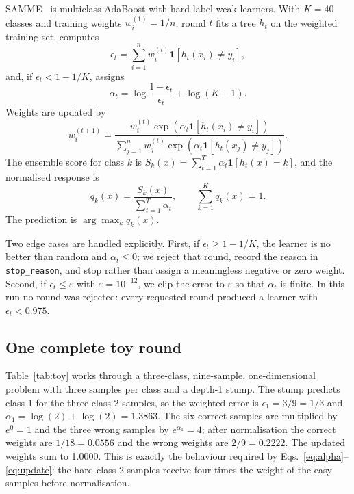 \documentclass[10pt,twocolumn,letterpaper]{article}
\begin{document}
SAMME~\cite{zhu2009,freund1997} is multiclass AdaBoost with hard-label weak
learners.  With $K=40$
classes and training weights $w_i^{(1)}=1/n$, round $t$ fits a tree $h_t$ on the
weighted training set, computes
\begin{equation}
\epsilon_t=\sum_{i=1}^{n} w_i^{(t)}\mathbf{1}[h_t(x_i)\neq y_i],
\end{equation}
and, if $\epsilon_t<1-1/K$, assigns
\begin{equation}
\alpha_t=\log\frac{1-\epsilon_t}{\epsilon_t}+\log(K-1).
\label{eq:alpha}
\end{equation}
Weights are updated by
\begin{equation}
w_i^{(t+1)}=\frac{w_i^{(t)}\exp\!\left(\alpha_t\mathbf{1}[h_t(x_i)\neq y_i]\right)}
{\sum_{j=1}^{n}w_j^{(t)}\exp\!\left(\alpha_t\mathbf{1}[h_t(x_j)\neq y_j]\right)}.
\label{eq:update}
\end{equation}
The ensemble score for class $k$ is
$S_k(x)=\sum_{t=1}^{T}\alpha_t\mathbf{1}[h_t(x)=k]$, and the normalised
response is
\begin{equation}
q_k(x)=\frac{S_k(x)}{\sum_{t=1}^{T}\alpha_t},\qquad \sum_{k=1}^{K}q_k(x)=1.
\label{eq:q}
\end{equation}
The prediction is $\arg\max_k q_k(x)$.

Two edge cases are handled explicitly.  First, if $\epsilon_t\ge 1-1/K$, the
learner is no better than random and $\alpha_t\le 0$; we reject that round,
record the reason in \texttt{stop\_reason}, and stop rather than assign a
meaningless negative or zero weight.  Second, if $\epsilon_t\le\varepsilon$
with $\varepsilon=10^{-12}$, we clip the error to $\varepsilon$ so that
$\alpha_t$ is finite.  In this run no round was rejected: every requested round
produced a learner with $\epsilon_t<0.975$.

\subsection{One complete toy round}

Table~\ref{tab:toy} works through a three-class, nine-sample, one-dimensional
problem with three samples per class and a depth-1 stump.  The stump predicts
class 1 for the three class-2 samples, so the weighted error is
$\epsilon_1=3/9=1/3$ and
$\alpha_1=\log(2)+\log(2)=1.3863$.  The six correct samples are multiplied by
$e^0=1$ and the three wrong samples by $e^{\alpha_1}=4$; after normalisation the
correct weights are $1/18=0.0556$ and the wrong weights are $2/9=0.2222$.  The
updated weights sum to 1.0000.  This is exactly the behaviour required by
Eqs.~\eqref{eq:alpha}--\eqref{eq:update}: the hard class-2 samples receive four
times the weight of the easy samples before normalisation.
\end{document}
